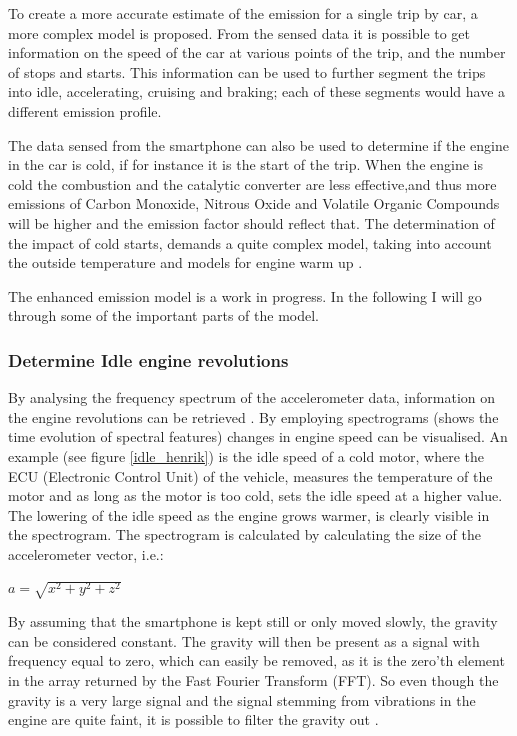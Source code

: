 To create a more accurate estimate of the emission for a single trip by car, a more complex model is proposed. From the sensed data it is possible to get information on the speed of the car at various points of the trip, and the number of stops and starts. This information can be used to further segment the trips into idle, accelerating, cruising and braking; each of these segments would have a different emission profile. 

The data sensed from the smartphone can also be used to determine if the engine in the car is cold, if for instance it is the start of the trip. When the engine is cold the combustion and the catalytic converter are less effective,and thus more emissions of Carbon Monoxide, Nitrous Oxide and Volatile Organic Compounds will be higher and the emission factor should reflect that. The determination of the impact of cold starts, demands a quite complex model, taking into account the outside temperature and models for engine warm up \cite{Ntziachristos2012}. 

The enhanced emission model is a work in progress. In the following I will go through some of the important parts of the model.

\subsubsection{Determine Idle engine revolutions}
By analysing the frequency spectrum of the accelerometer data, information on the engine revolutions can be retrieved \cite{markus2014}. By employing spectrograms (shows the time evolution of spectral features)  changes in engine speed can be visualised. An example (see figure  \ref{idle_henrik}) is the idle speed of a cold motor, where the ECU (Electronic Control Unit) of the vehicle, measures the temperature of the motor and as long as the motor is too cold, sets the idle speed at a higher value. The lowering of the idle speed as the engine grows warmer, is clearly visible in the spectrogram.
The spectrogram is calculated by calculating the size of the accelerometer vector, i.e.:

\begin{center}
$a = \sqrt{x^2+y^2+z^2}$
\end{center}

By assuming that the smartphone is kept still or only moved slowly, the gravity can be considered constant. The gravity will then be present as a signal with frequency equal to zero, which can easily be removed, as it is the zero'th element in the array returned by the Fast Fourier Transform (FFT). So even though the gravity is a very large signal and the signal stemming from vibrations in the engine are quite faint, it is possible to filter the gravity out \cite{Hemminki2013}.

